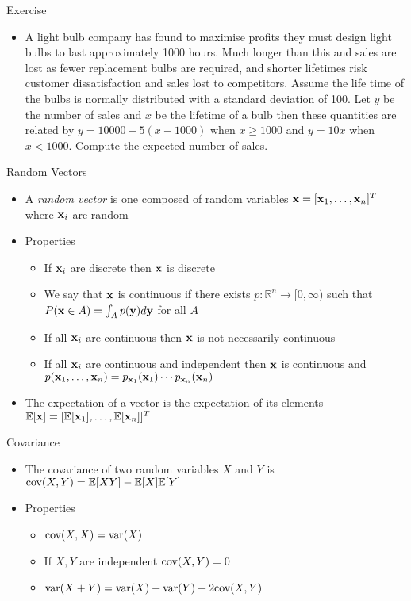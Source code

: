 \documentclass{beamer}
\begin{document}
\begin{frame}{Exercise} 
\begin{itemize} 
 \item A light bulb company has found to maximise profits they must design light bulbs to last approximately 1000 hours. Much longer than this and sales are lost as fewer replacement bulbs are required, and shorter lifetimes risk customer dissatisfaction and sales lost to competitors. Assume the life time of the bulbs is normally distributed with a standard deviation of 100. Let $y$ be the number of sales and $x$ be the lifetime of a bulb then these quantities are related by $y = 10000 - 5(x - 1000)$ when $x \geq 1000$ and $y = 10x$ when $x < 1000$. Compute the expected number of sales. 
\end{itemize}
\end{frame}


\begin{frame}{Random Vectors}
\begin{itemize} 
 \item A \emph{random vector} is one composed of random variables $\textbf{x} = [\textbf{x}_1, \ldots, \textbf{x}_n]^T$ where $\textbf{x}_i$ are random 
 \item Properties 
 \begin{itemize}
 \item If $\textbf{x}_i$ are discrete then $\textbf{x}$ is discrete 
 \item We say that $\textbf{x}$ is continuous if there exists $p: \mathbb{R}^n \rightarrow [0, \infty)$ such that $P(\textbf{x} \in A) = \int_A p(\textbf{y}) d \textbf{y} $ for all $A$
 \item If all $\textbf{x}_i$ are continuous then $\textbf{x}$ is not necessarily continuous
 \item If all $\textbf{x}_i$ are continuous and independent then $\textbf{x}$ is continuous and $p(\textbf{x}_1, \ldots, \textbf{x}_n) = p_{\textbf{x}_1}(\textbf{x}_1) \cdots p_{\textbf{x}_n}(\textbf{x}_n)$ 
 \end{itemize} 
 \item The expectation of a vector is the expectation of its elements  $\mathbb{E}[\textbf{x}] = [\mathbb{E}[\textbf{x}_1], \ldots, \mathbb{E}[\textbf{x}_n]]^T$ 
\end{itemize} 
\end{frame}

\begin{frame}{Covariance}  
\begin{itemize}
 \item The covariance of two random variables $X$ and $Y$ is $\mbox{cov}(X, Y) = \mathbb{E}[XY] - \mathbb{E}[X]\mathbb{E}[Y]$ 
 \item Properties 
 \begin{itemize}
 \item $\mbox{cov}(X, X) = \mbox{var}(X)$ 
 \item If $X, Y$ are independent $\mbox{cov}(X, Y) = 0$ 
 \item $\mbox{var}(X + Y) = \mbox{var}(X) + \mbox{var}(Y) + 2\mbox{cov}(X, Y)$ 
 \end{itemize} 
\end{itemize}
\end{frame}
\end{document}
